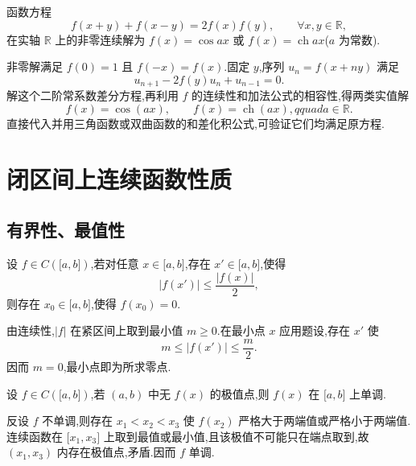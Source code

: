 \begin{example}
    函数方程
    \[
        f(x+y)+f(x-y)=2f(x)f(y),
        \qquad \forall x,y\in\mathbb{R},
    \]
    在实轴 $\mathbb{R}$ 上的非零连续解为 $f(x)=\cos ax$ 或 $f(x)=\operatorname{ch}ax$($a$ 为常数).
\end{example}
\exampleblank

\begin{solution}
    非零解满足 $f(0)=1$ 且 $f(-x)=f(x)$.固定 $y$,序列 $u_n=f(x+ny)$ 满足
    \[
        u_{n+1}-2f(y)u_n+u_{n-1}=0.
    \]
    解这个二阶常系数差分方程,再利用 $f$ 的连续性和加法公式的相容性,得两类实值解
    \[
        f(x)=\cos(ax),\qquad f(x)=\operatorname{ch}(ax),qquad a\in\mathbb R.
    \]
    直接代入并用三角函数或双曲函数的和差化积公式,可验证它们均满足原方程.
\end{solution}


\newpage

\section{闭区间上连续函数性质}


\subsection{有界性、最值性}

\begin{example}
    设 $f\in C(\lbrack a,b\rbrack)$,若对任意 $x\in\lbrack a,b\rbrack$,存在 $x'\in\lbrack a,b\rbrack$,使得
    \[
        |f(x')|\leq\dfrac{|f(x)|}{2},
    \]
    则存在 $x_0\in\lbrack a,b\rbrack$,使得 $f(x_0)=0$.
\end{example}
\exampleblank

\begin{solution}
    由连续性,$|f|$ 在紧区间上取到最小值 $m\geq0$.在最小点 $x$ 应用题设,存在 $x'$ 使
    \[
        m\leq |f(x')|\leq\dfrac{m}{2}.
    \]
    因而 $m=0$,最小点即为所求零点.
\end{solution}

\begin{example}
    设 $f\in C(\lbrack a,b\rbrack)$,若 $(a,b)$ 中无 $f(x)$ 的极值点,则 $f(x)$ 在 $\lbrack a,b\rbrack$ 上单调.
\end{example}
\exampleblank

\begin{solution}
    反设 $f$ 不单调,则存在 $x_1<x_2<x_3$ 使 $f(x_2)$ 严格大于两端值或严格小于两端值.连续函数在 $\lbrack x_1,x_3\rbrack$ 上取到最值或最小值,且该极值不可能只在端点取到,故 $(x_1,x_3)$ 内存在极值点,矛盾.因而 $f$ 单调.
\end{solution}

